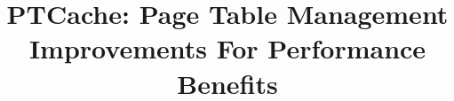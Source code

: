 \documentclass[10pt,preprint]{sigplanconf}
\begin{document}
\newcommand{\name}{PTCache\xspace}
\newcommand{\eat}[1]{}  %
\newcommand{\authcomment}[3]{\textcolor{#3}{#1 says: #2}}\newcommand{\yueqiang}[1]{\authcomment{Yueqiang}{#1}{red}}
\newcommand{\zhi}[1]{\authcomment{Zhi}{#1}{red}}



\date{}

\title{\Large \bf PTCache: Page Table Management Improvements For Performance Benefits }


\maketitle
\end{document}
